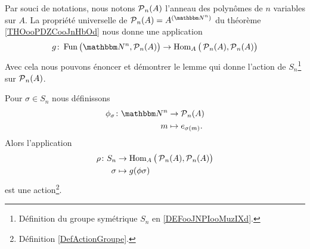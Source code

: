 Par souci de notations, nous notons \( \operatorname{\mathcal{P}}_n(A)\) l'anneau des polynômes de \( n\) variables sur \( A\). La propriété universelle de \( \Poly_n(A)=A^{(\eN^n)}\) du théorème \ref{THOooPDZCooJnHbOd} nous donne une application
\begin{equation}
    g\colon \Fun\big(\eN^n,\Poly_n(A)\big)\to \Hom_A\big( \Poly_n(A),\Poly_n(A) \big)
\end{equation}
Avec cela nous pouvons énoncer et démontrer le lemme qui donne l'action de \( S_n\)\footnote{Définition du groupe symétrique \( S_n\) en \ref{DEFooJNPIooMuzIXd}.} sur \( \operatorname{\mathcal{P}}_n(A)\).

\begin{lemma}       \label{LEMooIRVQooHvoNBq}
    Pour \( \sigma\in S_n\) nous définissons 
    \begin{equation}
        \begin{aligned}
            \phi_{\sigma}\colon \eN^n&\to \Poly_n(A) \\
            m&\mapsto e_{\sigma(m)}. 
        \end{aligned}
    \end{equation}
    Alors l'application
    \begin{equation}
        \begin{aligned}
            \rho\colon S_n&\to \operatorname{Hom}_A\big( \operatorname{\mathcal{P}}_n(A),\operatorname{\mathcal{P}}_n(A) \big) \\
            \sigma&\mapsto g(\phi{\sigma}) 
        \end{aligned}
    \end{equation}
    est une action\footnote{Définition \ref{DefActionGroupe}.}.
\end{lemma}


